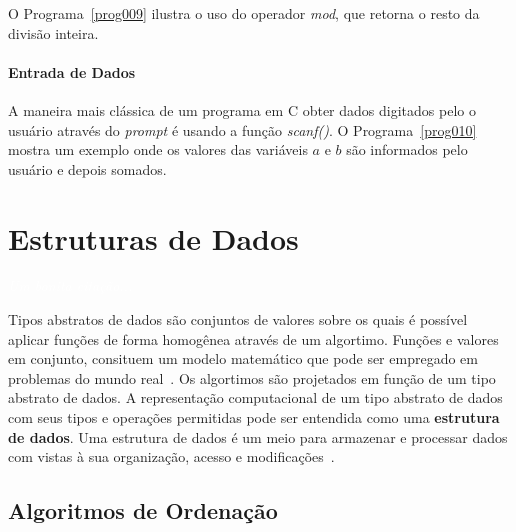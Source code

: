 \documentclass[11pt,fleqn]{book} %
\begin{document}
O Programa~\ref{prog009} ilustra o uso do operador \textit{mod}, que retorna o resto da divisão inteira.


\subsubsection{Entrada de Dados}

A maneira mais clássica de um programa em C obter dados digitados pelo o usuário através do \textit{prompt} é usando a função \textit{scanf()}. O Programa~\ref{prog010} mostra um exemplo onde os valores das variáveis $a$ e $b$ são informados pelo usuário e depois somados.



\chapter{Estruturas de Dados}\label{estrutura}
\vspace{6em}
\begin{flushright}
	\textit{\textcolor{white}{Um bonita citação...}}
\end{flushright}
\vspace{12em}

Tipos abstratos de dados são conjuntos de valores sobre os quais é possível aplicar funções de forma homogênea através de um algortimo.
Funções e valores em conjunto, consituem um modelo matemático que pode ser empregado em problemas do mundo real~\cite{ascencio2010}.
Os algortimos são projetados em função de um tipo abstrato de dados.
A representação computacional de um tipo abstrato de dados com seus tipos e operações permitidas pode ser entendida como uma \textbf{estrutura de dados}.
Uma estrutura de dados é um meio para armazenar e processar dados com vistas à sua organização, acesso e modificações~\cite{cormen2009}.

\section{Algoritmos de Ordenação}\label{ordenacao}
\end{document}
